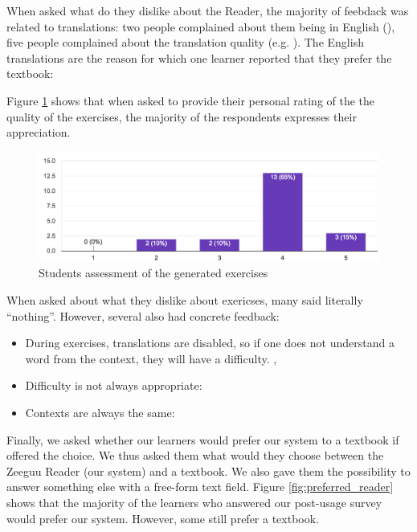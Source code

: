 When asked what do they dislike about the Reader, the majority of feebdack was related to translations: two people complained about them being in English (), five people complained about the translation quality (e.g. ). The English translations are the reason for which one learner reported that they prefer the textbook: 

Figure \ref{fig:ex_rating} shows that when asked to provide their personal rating of the the quality of the exercises, the majority of the respondents expresses their appreciation. 

 \begin{figure}[h!]
    \centering
      \includegraphics[width=0.8\columnwidth]{figures/opinions/exercises_rating}
      \caption{Students assessment  of the generated exercises}
      \label{fig:ex_rating}
    \end{figure}

When asked about what they dislike about exericses, many said literally ``nothing''. However, several also had concrete feedback: 
\begin{itemize}
	\item During exercises, translations are disabled, so if one does not understand a word from the context, they will have a difficulty.
		,
	\item Difficulty is not always appropriate: 
	\item Contexts are always the same: 
\end{itemize}

Finally, we asked whether our learners would prefer our system to a textbook if offered the choice. We thus asked them what would they choose between the Zeeguu Reader (our system) and a textbook. We also gave them the possibility to answer something else with a free-form text field. Figure \ref{fig:preferred_reader} shows that the majority of the learners who answered our post-usage survey would prefer our system. However, some still prefer a textbook. 

